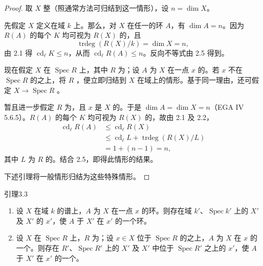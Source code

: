 \begin{proof}
取 $X$ 整（照通常方法可归结到这一情形），设 $n=\dim X$。

先假定 $X$ 定义在域 $k$ 上。那么，对 $X$ 在任一的环 $A$，有 $\dim A=n$。因为 $R(A)$ 的每个 $K$ 均可视为 $R(X)$ 的，且
\[
 \operatorname{trdeg}(R(X)/k)=\dim X=n,
\]
由 2.1 得 $\operatorname{cd}_\ell K\leq n$，从而 $\operatorname{cd}_\ell R(A)\leq n$。反向不等式由 2.5 得到。

现在假定 $X$ 在 $\operatorname{Spec}R$ 上，其中 $R$ 为；设 $A$ 为 $X$ 在一点 $x$ 的。若 $x$ 不在 $\operatorname{Spec}R$ 的之上，将 $R$ ，便立即归结到 $X$ 在域上的情形。基于同一理由，还可假定 $X\to\operatorname{Spec}R$ 。

暂且进一步假定 $R$ 为，且 $x$ 是 $X$ 的。于是 $\dim A=\dim X=n$（EGA IV 5.6.5）。$R(A)$ 的每个 $K$ 均可视为 $R(X)$ 的，故由 2.1 及 2.2，
\[
\begin{split}
 \operatorname{cd}_\ell R(A)&\leq\operatorname{cd}_\ell R(X)\\
 &\leq\operatorname{cd}_\ell L+\operatorname{trdeg}(R(X)/L)\\
 &=1+(n-1)=n,
\end{split}
\]
其中 $L$ 为 $R$ 的。结合 2.5，即得此情形的结果。

下述引理将一般情形归结为这些特殊情形。
\end{proof}
\begin{SGAresult}{引理}{3.3}
\begin{enumerate}
\item[(i)] 设 $X$ 在域 $k$ 的谱上，$A$ 为 $X$ 在一点 $x$ 的环。则存在域 $k'$、$\operatorname{Spec}k'$ 上的 $X'$ 及 $X'$ 的 $x'$，使 $A$ 于 $X'$ 在 $x'$ 的一个环。
\item[(ii)] 设 $X$ 在 $\operatorname{Spec}R$ 上，$R$ 为；设 $x\in X$ 位于 $\operatorname{Spec}R$ 的之上，$A$ 为 $X$ 在 $x$ 的一个。则存在 $R'$、$\operatorname{Spec}R'$ 上的 $X'$ 及 $X'$ 中位于 $\operatorname{Spec}R'$ 之上的 $x'$，使 $A$ 于 $X'$ 在 $x'$ 的一个。
\end{enumerate}
\end{SGAresult}
